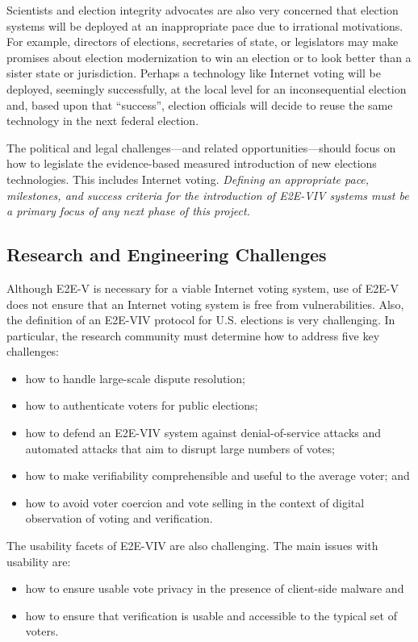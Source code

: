 Scientists and election integrity advocates are also very concerned
that election systems will be deployed at an inappropriate pace due to
irrational motivations. For example, directors of elections,
secretaries of state, or legislators may make promises about election
modernization to win an election or to look better than a sister state
or jurisdiction. Perhaps a technology like Internet voting will be
deployed, seemingly successfully, at the local level for an
inconsequential election and, based upon that ``success'', election
officials will decide to reuse the same technology in the next federal
election.

The political and legal challenges---and related
opportunities---should focus on how to legislate the evidence-based
measured introduction of new elections technologies. This includes
Internet voting. \emph{Defining an appropriate pace, milestones, and
  success criteria for the introduction of E2E-VIV systems must be a
  primary focus of any next phase of this project.}

\subsection{Research and Engineering Challenges}

Although E2E-V is necessary for a viable Internet voting system, use
of E2E-V does not ensure that an Internet voting system is free from
vulnerabilities. Also, the definition of an E2E-VIV protocol for
U.S. elections is very challenging. In particular, the research
community must determine how to address five key challenges:
\begin{itemize}
\item how to handle large-scale dispute resolution;
\item how to authenticate voters for public elections;
\item how to defend an E2E-VIV system against denial-of-service
  attacks and automated attacks that aim to disrupt large numbers of
  votes;
\item how to make verifiability comprehensible and useful to the
  average voter; and
\item how to avoid voter coercion and vote selling in the context of
  digital observation of voting and verification.
\end{itemize}

The usability facets of E2E-VIV are also challenging. The main issues
with usability are:
\begin{itemize}
\item how to ensure usable vote privacy in the presence of client-side
  malware and
\item how to ensure that verification is usable and accessible to the
  typical set of voters.
\end{itemize}

